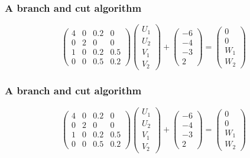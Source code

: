 \frame
{
\frametitle{A branch and cut algorithm}
\[\left(\begin{array}{cccc}
4&0&0.2&0\\
0&2&0&0\\
1&0&0.2&0.5\\
0&0&0.5&0.2
 \end{array}\right) \left(\begin{array}{c}
 U_1\\
 U_2\\
 V_1\\
 V_2
 \end{array}\right) + \left(\begin{array}{c}
 -6\\
 -4\\
 -3\\
 2
 \end{array}\right) =  \left(\begin{array}{c}
 0\\
 0\\
 W_1\\
 W_2
 \end{array}\right) 
 \]
\begin{figure}[h]
\centerline{
 \scalebox{0.5}{
    
 }
}
\end{figure}

}
\frame
{
\frametitle{A branch and cut algorithm}
\[\left(\begin{array}{cccc}
4&0&0.2&0\\
0&2&0&0\\
1&0&0.2&0.5\\
0&0&0.5&0.2
 \end{array}\right) \left(\begin{array}{c}
 U_1\\
 U_2\\
 V_1\\
 V_2
 \end{array}\right) + \left(\begin{array}{c}
 -6\\
 -4\\
 -3\\
 2
 \end{array}\right) =  \left(\begin{array}{c}
 0\\
 0\\
 W_1\\
 W_2
 \end{array}\right) 
 \]
\begin{figure}[h]
\centerline{
 \scalebox{0.5}{
    
 }
}
\end{figure}

}